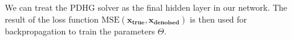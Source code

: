 \documentclass[12pt]{article}
\begin{document}
We can treat the PDHG solver as the final hidden layer in our network. 
The result of the loss function $\text{MSE}(\mathbf{x_{\text{true}}}, \mathbf{x_{\text{denoised}}})$ 
is then used for backpropagation to train the parameters $\Theta$.







\end{document}

